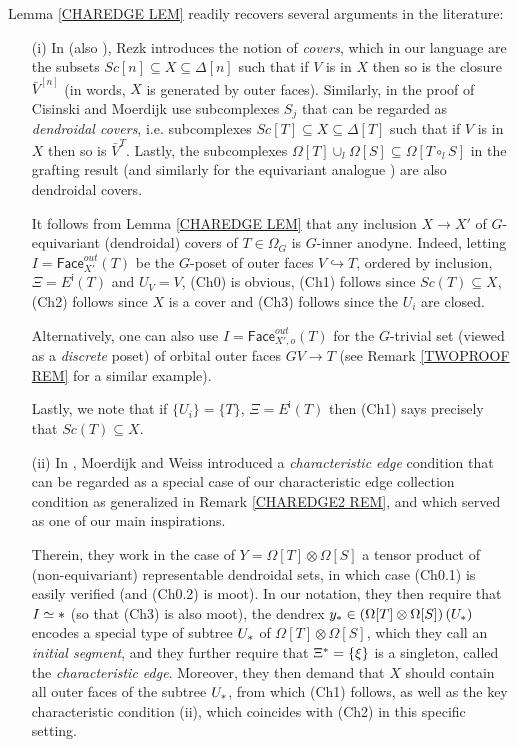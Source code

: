 \documentclass[a4paper,10pt,draft]{article}%
\begin{document}
\begin{remark} Lemma \ref{CHAREDGE LEM} readily recovers several arguments in the literature:
\begin{itemize}
\item[(i)] In \cite[\S 10]{Rez01} (also \cite[\S 6.2]{Rez10}), Rezk introduces the notion of \textit{covers}, which in our language are the subsets
$Sc[n] \subseteq X \subseteq \Delta[n]$
such that if $V$ is in $X$ then so is the closure $\bar{V}^{[n]}$
(in words, $X$ is generated by outer faces).
Similarly, in the proof of \cite[Prop. 2.4]{CM13a}
Cisinski and Moerdijk use subcomplexes $S_j$ that can be regarded as
\textit{dendroidal covers},
i.e. subcomplexes
$Sc[T] \subseteq X \subseteq \Delta[T]$
such that if $V$ is in $X$ then so is $\bar{V}^{T}$.
Lastly, the subcomplexes 
$\Omega[T] \cup_l \Omega[S] \subseteq \Omega[T \circ_l S]$
in the grafting result \cite[Lemma 5.2]{MW09} (and similarly for the equivariant analogue \cite[Prop. 6.19]{Per17}) are also dendroidal covers.

It follows from Lemma \ref{CHAREDGE LEM}
that any inclusion $X \to X'$ of $G$-equivariant (dendroidal) covers of $T\in \Omega_G$
is $G$-inner anodyne. 
Indeed, letting $I=\mathsf{Face}_{X'}^{out}(T)$ be the $G$-poset of outer faces $V \hookrightarrow T$, ordered by inclusion, 
$\Xi = E^{\mathsf{i}}(T)$ and $U_V = V$,
(Ch0) is obvious, (Ch1) follows since 
$Sc(T) \subseteq X$, (Ch2) follows since $X$ is a cover and
(Ch3) follows since the $U_i$ are closed.

Alternatively, one can also use $I=\mathsf{Face}_{X',o}^{out}(T)$
for the $G$-trivial set (viewed as a \textit{discrete} poset)
of orbital outer faces $GV \to T$ (see Remark \ref{TWOPROOF REM} for a similar example).

Lastly, we note that if $\{U_i\}=\{T\}$, $\Xi=E^{\mathsf{i}}(T)$
then (Ch1) says precisely that $Sc(T) \subseteq X$.


\item[(ii)] In \cite[Lemma 9.7]{MW09}, Moerdijk and Weiss introduced a \textit{characteristic edge} condition that can be regarded as a special case of our characteristic edge collection condition as generalized in Remark \ref{CHAREDGE2 REM}, and which served as one of our main inspirations.

Therein, they work in the case of $Y= \Omega[T] \otimes \Omega[S]$
a tensor product of (non-equivariant) representable dendroidal sets, in which case (Ch0.1) is easily verified (and (Ch0.2) is moot).
In our notation, they then require that $I \simeq \**$ (so that (Ch3) is also moot), 
the dendrex 
$y_{\**} \in \left(\Omega[T] \otimes \Omega[S]\right)(U_{\**})$ encodes a special type of subtree $U_{\**}$ of $\Omega[T] \otimes \Omega[S]$, which they call an \textit{initial segment},
and they further require that $\Xi^{\**} = \{\xi\}$ is a singleton, called the \textit{characteristic edge}.
Moreover, they then demand that $X$ should contain all outer faces of the subtree $U_{\**}$, from which (Ch1) follows, 
as well as the key characteristic condition 
\cite[Lemma 9.7]{MW09}(ii),
which coincides with (Ch2) in this specific setting.


\end{itemize}
\end{remark}
\end{document}
